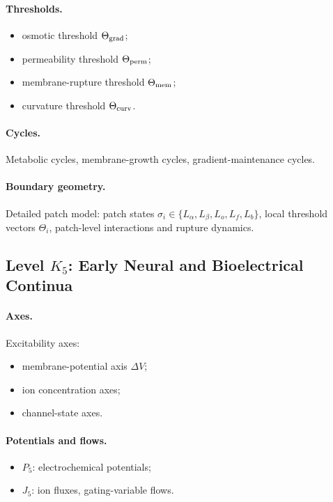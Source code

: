 \paragraph{Thresholds.}
\begin{itemize}
    \item osmotic threshold \(\Theta_{\rm grad}\);
    \item permeability threshold \(\Theta_{\rm perm}\);
    \item membrane-rupture threshold \(\Theta_{\rm mem}\);
    \item curvature threshold \(\Theta_{\rm curv}\).
\end{itemize}

\paragraph{Cycles.}
Metabolic cycles, membrane-growth cycles, gradient-maintenance cycles.

\paragraph{Boundary geometry.}
Detailed patch model:
patch states \(\sigma_i\in\{L_\alpha,L_\beta,L_o,L_f,L_b\}\),
local threshold vectors \(\Theta_i\),
patch-level interactions and rupture dynamics.


\subsection{Level \texorpdfstring{\texorpdfstring{$K_5$}{K\_5}}{K5}: Early Neural and Bioelectrical Continua}

\paragraph{Axes.}
Excitability axes:
\begin{itemize}
    \item membrane-potential axis \(\Delta V\);
    \item ion concentration axes;
    \item channel-state axes.
\end{itemize}

\paragraph{Potentials and flows.}
\begin{itemize}
    \item \(P_5\): electrochemical potentials;
    \item \(J_5\): ion fluxes, gating-variable flows.
\end{itemize}

